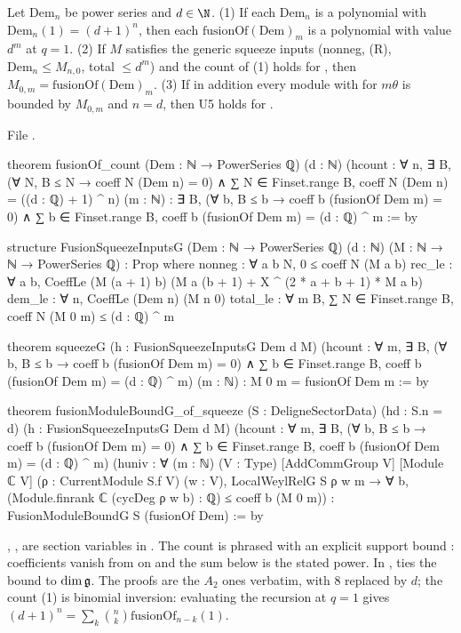 \begin{theorem}\label{l26:thm:squeezeG}
Let $\mathrm{Dem}_n$ be power series and $d\in\N$. (1) If each $\mathrm{Dem}_n$ is a polynomial with $\mathrm{Dem}_n(1)=(d+1)^n$,
then each $\mathrm{fusionOf}(\mathrm{Dem})_m$ is a polynomial with value $d^m$ at $q=1$. (2) If $M$ satisfies the generic squeeze
inputs (nonneg, (R), $\mathrm{Dem}_n\le M_{n,0}$, total $\le d^m$) and the count of (1) holds for , then
$M_{0,m}=\mathrm{fusionOf}(\mathrm{Dem})_m$. (3) If in addition every module with  for $m\theta$ is bounded by
$M_{0,m}$ and $n=d$, then U5 holds for .
\end{theorem}
\noindent File .
\begin{leancode}
theorem fusionOf_count (Dem : ℕ → PowerSeries ℚ) (d : ℕ)
    (hcount : ∀ n, ∃ B, (∀ N, B ≤ N → coeff N (Dem n) = 0) ∧
      ∑ N ∈ Finset.range B, coeff N (Dem n) = ((d : ℚ) + 1) ^ n) (m : ℕ) :
    ∃ B, (∀ b, B ≤ b → coeff b (fusionOf Dem m) = 0) ∧
      ∑ b ∈ Finset.range B, coeff b (fusionOf Dem m) = (d : ℚ) ^ m := by

structure FusionSqueezeInputsG (Dem : ℕ → PowerSeries ℚ) (d : ℕ) (M : ℕ → ℕ → PowerSeries ℚ) :
    Prop where
  nonneg : ∀ a b N, 0 ≤ coeff N (M a b)
  rec_le : ∀ a b, CoeffLe (M (a + 1) b) (M a (b + 1) + X ^ (2 * a + b + 1) * M a b)
  dem_le : ∀ n, CoeffLe (Dem n) (M n 0)
  total_le : ∀ m B, ∑ N ∈ Finset.range B, coeff N (M 0 m) ≤ (d : ℚ) ^ m

theorem squeezeG (h : FusionSqueezeInputsG Dem d M)
    (hcount : ∀ m, ∃ B, (∀ b, B ≤ b → coeff b (fusionOf Dem m) = 0) ∧
      ∑ b ∈ Finset.range B, coeff b (fusionOf Dem m) = (d : ℚ) ^ m) (m : ℕ) :
    M 0 m = fusionOf Dem m := by

theorem fusionModuleBoundG_of_squeeze (S : DeligneSectorData) (hd : S.n = d)
    (h : FusionSqueezeInputsG Dem d M)
    (hcount : ∀ m, ∃ B, (∀ b, B ≤ b → coeff b (fusionOf Dem m) = 0) ∧
      ∑ b ∈ Finset.range B, coeff b (fusionOf Dem m) = (d : ℚ) ^ m)
    (huniv : ∀ (m : ℕ) (V : Type) [AddCommGroup V] [Module ℂ V] (ρ : CurrentModule S.f V) (w : V),
      LocalWeylRelG S ρ w m → ∀ b, (Module.finrank ℂ (cycDeg ρ w b) : ℚ) ≤ coeff b (M 0 m)) :
    FusionModuleBoundG S (fusionOf Dem) := by
\end{leancode}

\begin{dictionary}
, ,  are section variables in . The count is phrased with an explicit support bound
: coefficients vanish from  on and the sum below  is the stated power. In ,
 ties the bound to $\dim\mathfrak g$. The proofs are the $A_2$ ones verbatim, with $8$ replaced by $d$; the
count (1) is binomial inversion: evaluating the recursion at $q=1$ gives $(d+1)^n=\sum_k\binom nk\mathrm{fusionOf}_{n-k}(1)$.
\end{dictionary}

